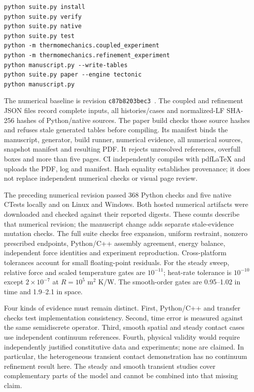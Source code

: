 \documentclass[10pt,a4paper]{article}
\begin{document}
\noindent\begin{minipage}{\linewidth}
\begin{verbatim}
python suite.py install
python suite.py verify
python suite.py native
python suite.py test
python -m thermomechanics.coupled_experiment
python -m thermomechanics.refinement_experiment
python manuscript.py --write-tables
python suite.py paper --engine tectonic
python manuscript.py
\end{verbatim}
\end{minipage}

The numerical baseline is revision \texttt{c87b8203bec3}~\cite{code}. The coupled and refinement JSON files record complete inputs, all histories/cases and normalized-LF SHA-256 hashes of Python/native sources. The paper build checks those source hashes and refuses stale generated tables before compiling. Its manifest binds the manuscript, generator, build runner, numerical evidence, all numerical sources, snapshot manifest and resulting PDF. It rejects unresolved references, overfull boxes and more than five pages. CI independently compiles with pdfLaTeX and uploads the PDF, log and manifest. Hash equality establishes provenance; it does not replace independent numerical checks or visual page review.

The preceding numerical revision passed 368 Python checks and five native CTests locally and on Linux and Windows. Both hosted numerical artifacts were downloaded and checked against their reported digests. These counts describe that numerical revision; the manuscript change adds separate stale-evidence mutation checks. The full suite checks free expansion, uniform restraint, nonzero prescribed endpoints, Python/C++ assembly agreement, energy balance, independent force identities and experiment reproduction. Cross-platform tolerances account for small floating-point residuals. For the steady sweep, relative force and scaled temperature gates are $10^{-11}$; heat-rate tolerance is $10^{-10}$ except $2\times10^{-7}$ at $R=10^5$ m$^2$ K/W. The smooth-order gates are 0.95--1.02 in time and 1.9--2.1 in space.

Four kinds of evidence must remain distinct. First, Python/C++ and transfer checks test implementation consistency. Second, time error is measured against the same semidiscrete operator. Third, smooth spatial and steady contact cases use independent continuum references. Fourth, physical validity would require independently justified constitutive data and experiments; none are claimed. In particular, the heterogeneous transient contact demonstration has no continuum refinement result here. The steady and smooth transient studies cover complementary parts of the model and cannot be combined into that missing claim.
\end{document}
